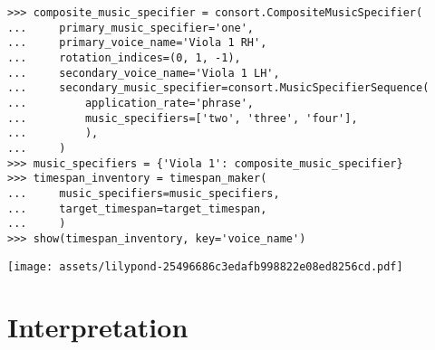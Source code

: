 \begin{comment}
<abjad>
composite_music_specifier = consort.CompositeMusicSpecifier(
    primary_music_specifier='one',
    primary_voice_name='Viola 1 RH',
    rotation_indices=(0, 1, -1),
    secondary_voice_name='Viola 1 LH',
    secondary_music_specifier=consort.MusicSpecifierSequence(
        application_rate='phrase',
        music_specifiers=['two', 'three', 'four'],
        ),
    )
music_specifiers = {'Viola 1': composite_music_specifier}
timespan_inventory = timespan_maker(
    music_specifiers=music_specifiers,
    target_timespan=target_timespan,
    )
show(timespan_inventory, key='voice_name')
</abjad>
\end{comment}

\begin{abjadbookoutput}
\begin{singlespacing}
\vspace{-0.5\baselineskip}
\begin{verbatim}
>>> composite_music_specifier = consort.CompositeMusicSpecifier(
...     primary_music_specifier='one',
...     primary_voice_name='Viola 1 RH',
...     rotation_indices=(0, 1, -1),
...     secondary_voice_name='Viola 1 LH',
...     secondary_music_specifier=consort.MusicSpecifierSequence(
...         application_rate='phrase',
...         music_specifiers=['two', 'three', 'four'],
...         ),
...     )
>>> music_specifiers = {'Viola 1': composite_music_specifier}
>>> timespan_inventory = timespan_maker(
...     music_specifiers=music_specifiers,
...     target_timespan=target_timespan,
...     )
>>> show(timespan_inventory, key='voice_name')
\end{verbatim}
\noindent\texttt{[image: assets/lilypond-25496686c3edafb998822e08ed8256cd.pdf]}
\end{singlespacing}
\end{abjadbookoutput}

\section{Interpretation}
\label{sec:interpretation}

